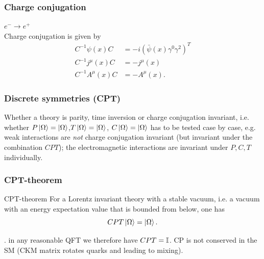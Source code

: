 \subsubsection{Charge conjugation}
 $e^- \rightarrow e^+$\\
 Charge conjugation is given by
 \begin{align}
 	C^{-1}\psi(x)C &= -i (\bar{\psi}(x) \gamma^0 \gamma^2)^T\\
 	C^{-1} j^\mu(x) C &= - j^\mu(x)\\
 	C^{-1} A^\mu(x) C &= - A^\mu(x).
 \end{align}
 \subsubsection{Discrete symmetries (CPT)}
Whether a theory is parity, time inversion or charge conjugation invariant, i.e. whether $P\ket{\Omega}=\ket{\Omega}$,$T\ket{\Omega}=\ket{\Omega}$, $C\ket{\Omega}=\ket{\Omega}$ has to be tested case by case, e.g. weak interactions are \emph{not} charge conjugation invariant (but invariant under the combination $CPT$); the electromagnetic interactions are invariant under $P,C,T$ individually.
\subsubsection{CPT-theorem}
\begin{mybox}{CPT-theorem }
	For a Lorentz invariant theory with a stable vacuum, i.e. a vacuum with an energy expectation value that is bounded from below,
	one has
	\begin{equation}
	\label{eq:cpttheorem}
		CPT \ket{\Omega}=\ket{\Omega}.
	\end{equation}
\end{mybox}. 
in any reasonable QFT we therefore have $CPT=\mathbb{I}$. CP is not conserved in the SM (CKM matrix rotates quarks and leading to mixing).
